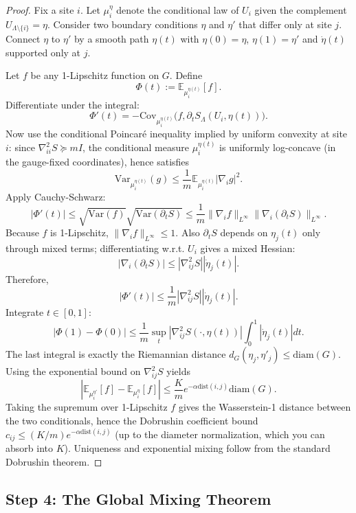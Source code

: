 \begin{proof}
Fix a site $i$. Let $\mu_i^{\eta}$ denote the conditional law of $U_i$ given the complement $U_{\Lambda\setminus\{i\}}=\eta$. Consider two boundary conditions $\eta$ and $\eta'$ that differ only at site $j$. Connect $\eta$ to $\eta'$ by a smooth path $\eta(t)$ with $\eta(0)=\eta$, $\eta(1)=\eta'$ and $\dot\eta(t)$ supported only at $j$.

Let $f$ be any 1-Lipschitz function on $G$. Define
\[
\Phi(t) := \mathbb E_{\mu_i^{\eta(t)}}[f].
\]
Differentiate under the integral:
\[
\Phi'(t) = -\mathrm{Cov}_{\mu_i^{\eta(t)}}\big(f,\partial_t S_\Lambda(U_i,\eta(t))\big).
\]
Now use the conditional Poincaré inequality implied by uniform convexity at site $i$: since $\nabla^2_{ii}S \succeq m I$, the conditional measure $\mu_i^{\eta(t)}$ is uniformly log-concave (in the gauge-fixed coordinates), hence satisfies
\[
\mathrm{Var}_{\mu_i^{\eta(t)}}(g) \le \frac{1}{m} \mathbb E_{\mu_i^{\eta(t)}}|\nabla_i g|^2.
\]
Apply Cauchy-Schwarz:
\[
|\Phi'(t)| \le \sqrt{\mathrm{Var}(f)}\sqrt{\mathrm{Var}(\partial_t S)}
\le \frac{1}{m} \|\nabla_i f\|_{L^\infty} \|\nabla_i(\partial_t S)\|_{L^\infty}.
\]
Because $f$ is 1-Lipschitz, $\|\nabla_i f\|_{L^\infty} \le 1$. Also $\partial_t S$ depends on $\eta_j(t)$ only through mixed terms; differentiating w.r.t. $U_i$ gives a mixed Hessian:
\[
|\nabla_i(\partial_t S)| \le |\nabla^2_{ij} S| |\dot\eta_j(t)|.
\]
Therefore,
\[
|\Phi'(t)| \le \frac{1}{m} |\nabla^2_{ij}S| |\dot\eta_j(t)|.
\]
Integrate $t \in [0,1]$:
\[
|\Phi(1)-\Phi(0)| \le \frac{1}{m}\sup_t |\nabla^2_{ij}S(\cdot,\eta(t))| \int_0^1|\dot\eta_j(t)| dt.
\]
The last integral is exactly the Riemannian distance $d_G(\eta_j,\eta'_j) \le \mathrm{diam}(G)$. Using the exponential bound on $\nabla^2_{ij}S$ yields
\[
|\mathbb E_{\mu_i^{\eta'}}[f]-\mathbb E_{\mu_i^{\eta}}[f]|
\le \frac{K}{m} e^{-\alpha \mathrm{dist}(i,j)} \mathrm{diam}(G).
\]
Taking the supremum over 1-Lipschitz $f$ gives the Wasserstein-1 distance between the two conditionals, hence the Dobrushin coefficient bound $c_{ij} \le (K/m)e^{-\alpha \mathrm{dist}(i,j)}$ (up to the diameter normalization, which you can absorb into $K$). Uniqueness and exponential mixing follow from the standard Dobrushin theorem.
\end{proof}

\subsection{Step 4: The Global Mixing Theorem}


